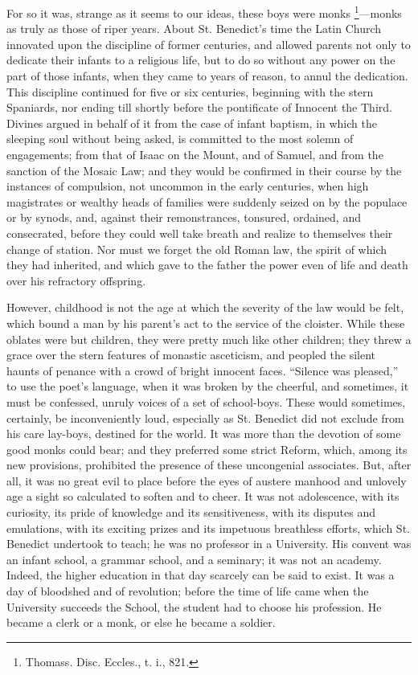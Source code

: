 For so it was, strange as it seems to our ideas, these boys were
monks \footnote{Thomass.
Disc. Eccles., t. i., 821.}—monks as truly
as those of riper years. About St. Benedict's time the Latin Church
innovated upon the discipline of former centuries, and allowed parents
not only to dedicate their infants to a religious life, but to do so
without any power on the part of those infants, when they came to
years of reason, to annul the dedication. This discipline continued
for five or six centuries, beginning with the stern Spaniards, nor
ending till shortly before the pontificate of Innocent the Third.
Divines argued in behalf of it from the case of infant baptism, in
which the sleeping soul without being asked, is committed to the most
solemn of engagements; from that of Isaac on the Mount, and of Samuel,
and from the sanction of the Mosaic Law; and they would be confirmed
in their course by the instances of compulsion, not uncommon in the
early centuries, when high magistrates or wealthy heads of families
were suddenly seized on by the populace or by synods, and, against
their remonstrances, tonsured, ordained, and consecrated, before they
could well take breath and realize to themselves their change of
station. Nor must we forget the old Roman law, the spirit of which
they had inherited, and which gave to the father the power even of
life and death over his refractory offspring.

However, childhood is not the age at which the severity of the law
would be felt, which bound a man by his parent's act to the service of
the cloister. While these oblates were but children, they were
pretty much like other children; they threw a grace over the stern
features of monastic asceticism, and peopled the silent haunts of
penance with a crowd of bright innocent faces. ``Silence was
pleased,'' to use the poet's language, when it was broken by the
cheerful, and sometimes, it must be confessed, unruly voices of a set
of school-boys. These would sometimes, certainly, be inconveniently
loud, especially as St. Benedict did not exclude from his care
lay-boys, destined for the world. It was more than the devotion of
some good monks could bear; and they preferred some strict Reform,
which, among its new provisions, prohibited the presence of these
uncongenial associates. But, after all, it was no great evil to place
before the eyes of austere manhood and unlovely age a sight so
calculated to soften and to cheer. It was not adolescence, with its
curiosity, its pride of knowledge and its sensitiveness, with its
disputes and emulations, with its exciting prizes and its impetuous
breathless efforts, which St. Benedict undertook to teach; he was no
professor in a University. His convent was an infant school, a grammar
school, and a seminary; it was not an academy. Indeed, the higher
education in that day scarcely can be said to exist. It was a day of
bloodshed and of revolution; before the time of life came when the
University succeeds the School, the student had to choose his
profession. He became a clerk or a monk, or else he became a soldier.

